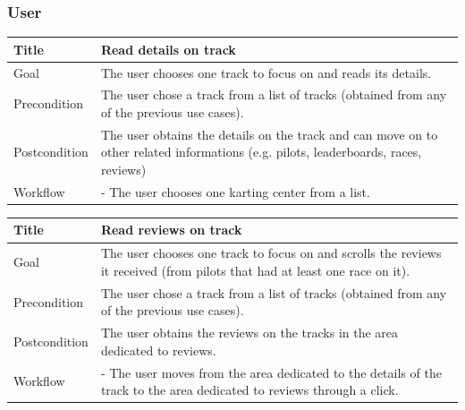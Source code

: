 \documentclass{beamer}
\begin{document}

\begin{frame}
    \frametitle{User}
    \begin{table}
        \tiny
        \begin{tabular}{|p{2cm}|p{6cm}|}
        \hline
        Title & \textbf{Read details on track} \\
        \hline
        Goal & The user chooses one track to focus on and reads its details. \\
        \hline
        Precondition & The user chose a track from a list of tracks (obtained from any of the previous use cases).\\
        \hline
        Postcondition & The user obtains the details on the track and can move on to other related informations (e.g. pilots, leaderboards, races, reviews)\\
        \hline
        Workflow &
        - The user chooses one karting center from a list. \\
        \hline
        \end{tabular}
\end{table}

\begin{table}
    \tiny
    \begin{tabular}{|p{2cm}|p{6cm}|}
    \hline
    Title & \textbf{Read reviews on track} \\
    \hline
    Goal & The user chooses one track to focus on and scrolls the reviews it received (from pilots
    that had at least one race on it). \\
    \hline
    Precondition & The user chose a track from a list of tracks (obtained from any of the previous use cases).\\
    \hline
    Postcondition & The user obtains the reviews on the tracks in the area dedicated to reviews. \\
    \hline
    Workflow &
    - The user moves from the area dedicated to the details of the track to the
    area dedicated to reviews through a click. \\
    \hline
    \end{tabular}
\end{table}
\end{frame}


\end{document}
